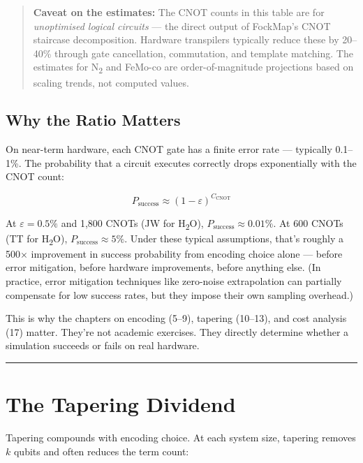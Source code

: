 \documentclass[
  11pt,
  oneside]{book}
\begin{document}
\begin{quote}
\textbf{Caveat on the estimates:} The CNOT counts in this table are for
\emph{unoptimised logical circuits} --- the direct output of FockMap's
CNOT staircase decomposition. Hardware transpilers typically reduce
these by 20--40\% through gate cancellation, commutation, and template
matching. The estimates for N\textsubscript{2} and FeMo-co are order-of-magnitude
projections based on scaling trends, not computed values.
\end{quote}

\subsection{Why the Ratio Matters}\label{why-the-ratio-matters}

On near-term hardware, each CNOT gate has a finite error rate ---
typically 0.1--1\%. The probability that a circuit executes correctly
drops exponentially with the CNOT count:

\[P_\text{success} \approx (1 - \varepsilon)^{C_\text{CNOT}}\]

At \(\varepsilon = 0.5\%\) and 1,800 CNOTs (JW for H\textsubscript{2}O),
\(P_\text{success} \approx 0.01\%\). At 600 CNOTs (TT for H\textsubscript{2}O),
\(P_\text{success} \approx 5\%\). Under these typical assumptions,
that's roughly a 500$\times$ improvement in success probability from encoding
choice alone --- before error mitigation, before hardware improvements,
before anything else. (In practice, error mitigation techniques like
zero-noise extrapolation can partially compensate for low success rates,
but they impose their own sampling overhead.)

This is why the chapters on encoding (5--9), tapering (10--13), and cost
analysis (17) matter. They're not academic exercises. They directly
determine whether a simulation succeeds or fails on real hardware.

\begin{center}\rule{0.5\linewidth}{0.5pt}\end{center}

\section{The Tapering Dividend}\label{the-tapering-dividend}

Tapering compounds with encoding choice. At each system size, tapering
removes \(k\) qubits and often reduces the term count:
\end{document}
